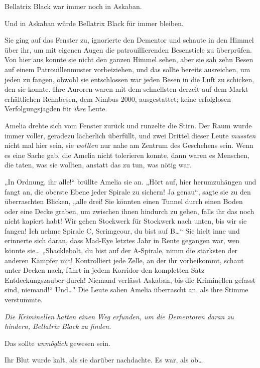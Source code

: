 {Bellatrix Black war immer noch in Askaban.

Und in Askaban würde Bellatrix Black für immer bleiben.

Sie ging auf das Fenster zu, ignorierte den Dementor und schaute in den Himmel über ihr, um mit eigenen Augen die patrouillierenden Besenstiele zu überprüfen. Von hier aus konnte sie nicht den ganzen Himmel sehen, aber sie sah zehn Besen auf einem Patrouillenmuster vorbeiziehen, und das sollte bereits ausreichen, um jeden zu fangen, obwohl sie entschlossen war jeden Besen in die Luft zu schicken, den sie konnte. Ihre Auroren waren mit dem schnellsten derzeit auf dem Markt erhältlichen Rennbesen, dem Nimbus 2000, ausgestattet; keine erfolglosen Verfolgungsjagden für \emph{ihre} Leute.

Amelia drehte sich vom Fenster zurück und runzelte die Stirn. Der Raum wurde immer voller, geradezu lächerlich überfüllt, und zwei Drittel dieser Leute \emph{mussten} nicht mal hier sein, sie \emph{wollten} nur nahe am Zentrum des Geschehens sein. Wenn es eine Sache gab, die Amelia nicht tolerieren konnte, dann waren es Menschen, die taten, was sie wollten, anstatt das zu tun, was nötig war.

„In Ordnung, ihr alle!“ brüllte Amelia sie an. „Hört auf, hier herumzuhängen und fangt an, die oberste Ebene jeder Spirale zu sichern! Ja genau“, sagte sie zu den überraschten Blicken, „alle drei! Sie könnten einen Tunnel durch einen Boden oder eine Decke graben, um zwischen ihnen hindurch zu gehen, falls ihr das noch nicht kapiert habt! Wir gehen Stockwerk für Stockwerk nach unten, bis wir sie fangen! Ich nehme Spirale C, Scrimgeour, du bist auf B…“ Sie hielt inne und erinnerte sich daran, dass Mad-Eye letztes Jahr in Rente gegangen war, wen könnte sie… „Shacklebolt, du bist auf der A-Spirale, nimm die stärksten der anderen Kämpfer mit! Kontrolliert jede Zelle, an der ihr vorbeikommt, schaut unter Decken nach, führt in jedem Korridor den kompletten Satz Entdeckungszauber durch! Niemand verlässt Askaban, bis die Kriminellen gefasst sind, niemand!“ Und…" Die Leute sahen Amelia überrascht an, als ihre Stimme verstummte.

\emph{Die Kriminellen hatten einen Weg erfunden, um die Dementoren daran zu hindern, Bellatrix Black zu finden.}

Das sollte \emph{unmöglich} gewesen sein.

Ihr Blut wurde kalt, als sie darüber nachdachte. Es war, als ob…

}

